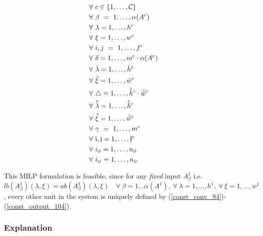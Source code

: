 \documentclass{article}
\begin{document}
\begin{align}
\notag \\
& \forall \ c \in \{ 1, \ldots, \mathcal{C} \} \label{forall:c_107} \\
&\forall \ \beta \ = \ 1, \ldots, \alpha(A^c) \label{forall:beta_108} \\
&\forall \ \lambda = 1,  \ldots, h^c \label{forall:lamda_109}\\
&\forall \ \xi = 1, \ldots, w^c \label{forall:xi_110}\\
&\forall \ i,j \ = \ 1,\ldots, f^c \label{forall:ij_111}\\
& \forall \ \delta = 1, \ldots, m^c \cdot \alpha(A^c) \label{forall:delta_112} \\
&\forall \ \tilde{\lambda}=1, \ldots, \tilde{h}^c \label{forall:lamdatilde_113} \\
&\forall \ \tilde{\xi}=1, \ldots, \tilde{w}^c \label{forall:xitilde_114} \\
&\forall \ \triangle =1, \ldots, \tilde{\tilde{h}}^c \cdot \tilde{\tilde{w}}^c \label{forall:triangle_115} \\
& \forall \ \tilde{\tilde{\lambda}}=1, \ldots, \tilde{\tilde{h}}^c \label{forall:lambdatildetilde_116}\\
& \forall \ \tilde{\tilde{\xi}}=1, \ldots, \tilde{\tilde{w}}^c \label{forall:xitildetilde:117}\\
&\forall \ \gamma \ = \ 1, \ldots, m^c \label{forall:gamma:116}\\
& \forall \ \mathfrak{i},\mathfrak{j} = 1, \ldots, \mathfrak{f}^c \label{forall:ij_117}\\
& \forall \ i_{\phi} = 1, \ldots, n_\phi \label{forall:iphi_118} \\
& \forall \ i_{\psi} = 1, \ldots, n_\psi \label{forall:ipsi_119}
\end{align}

This MILP formulation is feasible, since for any \textit{fixed} input $A_\beta^1$ i.e. $lb(A_\beta^1)(\lambda, \xi) = ub(A_\beta^1)(\lambda, \xi) \quad \forall \ \beta=1 \ldots \alpha(A^1), \ \forall \ \lambda=1, \ldots, h^1, \ \forall \ \xi = 1, \ldots, w^1$, every other unit in the system is uniquely defined by (\ref{const_conv_84})-(\ref{const_output_104}).

\subsubsection{Explanation}
\end{document}
